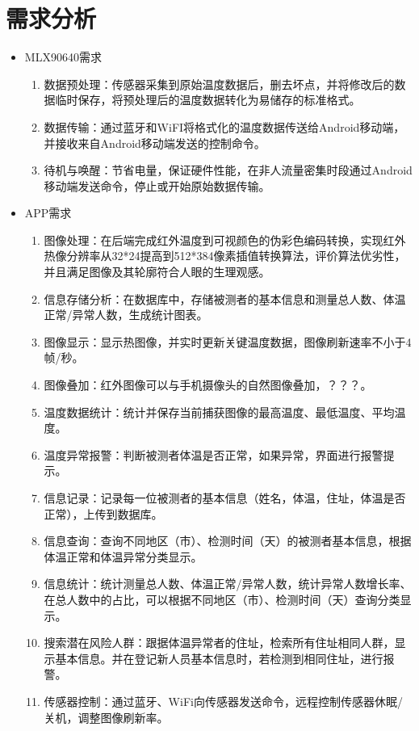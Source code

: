 \section{需求分析}
\begin{itemize}
\item MLX90640需求
    \begin{enumerate}
      \item {数据预处理}：传感器采集到原始温度数据后，删去坏点，并将修改后的数据临时保存，将预处理后的温度数据转化为易储存的标准格式。
      \item {数据传输}：通过蓝牙和WiFI将格式化的温度数据传送给Android移动端，并接收来自Android移动端发送的控制命令。
      \item {待机与唤醒}：节省电量，保证硬件性能，在非人流量密集时段通过Android移动端发送命令，停止或开始原始数据传输。
    \end{enumerate}
\item APP需求
    \begin{enumerate}
      \item {图像处理}：在后端完成红外温度到可视颜色的伪彩色编码转换，实现红外热像分辨率从32*24提高到512*384像素插值转换算法，评价算法优劣性，并且满足图像及其轮廓符合人眼的生理观感。
      \item {信息存储分析}：在数据库中，存储被测者的基本信息和测量总人数、体温正常/异常人数，生成统计图表。
      
      \item {图像显示}：显示热图像，并实时更新关键温度数据，图像刷新速率不小于4帧/秒。
      \item {图像叠加}：红外图像可以与手机摄像头的自然图像叠加，？？？。
      \item {温度数据统计}：统计并保存当前捕获图像的最高温度、最低温度、平均温度。
      \item {温度异常报警}：判断被测者体温是否正常，如果异常，界面进行报警提示。
      \item {信息记录}：记录每一位被测者的基本信息（姓名，体温，住址，体温是否正常），上传到数据库。
      \item {信息查询}：查询不同地区（市）、检测时间（天）的被测者基本信息，根据体温正常和体温异常分类显示。
      \item {信息统计}：统计测量总人数、体温正常/异常人数，统计异常人数增长率、在总人数中的占比，可以根据不同地区（市）、检测时间（天）查询分类显示。
      \item {搜索潜在风险人群}：跟据体温异常者的住址，检索所有住址相同人群，显示基本信息。并在登记新人员基本信息时，若检测到相同住址，进行报警。
      \item {传感器控制}：通过蓝牙、WiFi向传感器发送命令，远程控制传感器休眠/关机，调整图像刷新率。
    \end{enumerate}
\end{itemize}
